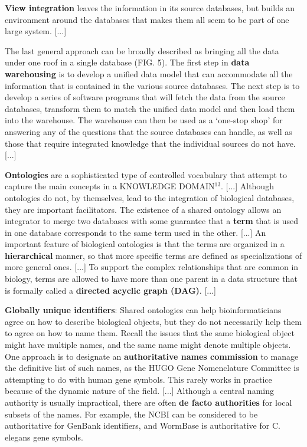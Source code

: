 \documentclass{article}
\begin{document}
\begin{itemize}
\begin{displayquote}
\textbf{View integration} leaves the information in its source databases, but builds an environment around the databases that makes them all seem to be part of one large system.
[...]

The last general approach can be broadly described as bringing all the data under one roof in a single database (FIG. 5). The first step in \textbf{data warehousing} is to develop a unified data model that can accommodate all the information that is contained in the various source databases. The next step is to develop a series of software programs that will fetch the data from the source databases, transform them to match the unified data model and then load them into the warehouse. The warehouse can then be used as a ‘one-stop shop’ for answering any of the questions that the source databases can handle, as well as those that require integrated knowledge that the individual sources do not have.
[...]

\textbf{Ontologies} are a sophisticated type of controlled vocabulary that attempt to capture the main concepts in a KNOWLEDGE DOMAIN$ ^{13} $. [...] Although ontologies do not, by themselves, lead to the integration of biological databases, they are important facilitators. The existence of a shared ontology allows an integrator to merge two databases with some guarantee that a \textbf{term} that is used in one database corresponds to the same term used in the other. [...] An important feature of biological ontologies is that the terms are organized in a \textbf{hierarchical} manner, so that more specific terms are defined as specializations of more general ones. [...] To support the complex relationships that are common in biology, terms are allowed to have more than one parent in a data structure that is formally called a \textbf{directed acyclic graph (DAG)}.
[...]

\textbf{Globally unique identifiers}: Shared ontologies can help bioinformaticians agree on how to describe biological objects, but they do not necessarily help them to agree on how to name them. Recall the issues that the same biological object might have multiple names, and the same name might denote multiple objects. One approach is to designate an \textbf{authoritative names commission} to manage the definitive list of such names, as the HUGO Gene Nomenclature Committee is attempting to do with human gene symbols. This rarely works in practice because of the dynamic nature of the field. [...] Although a central naming authority is usually impractical, there are often \textbf{de facto authorities} for local subsets of the names. For example, the NCBI can be considered to be authoritative for GenBank identifiers, and WormBase is authoritative for C. elegans gene symbols.
\end{displayquote}



\end{itemize}
\end{document}
